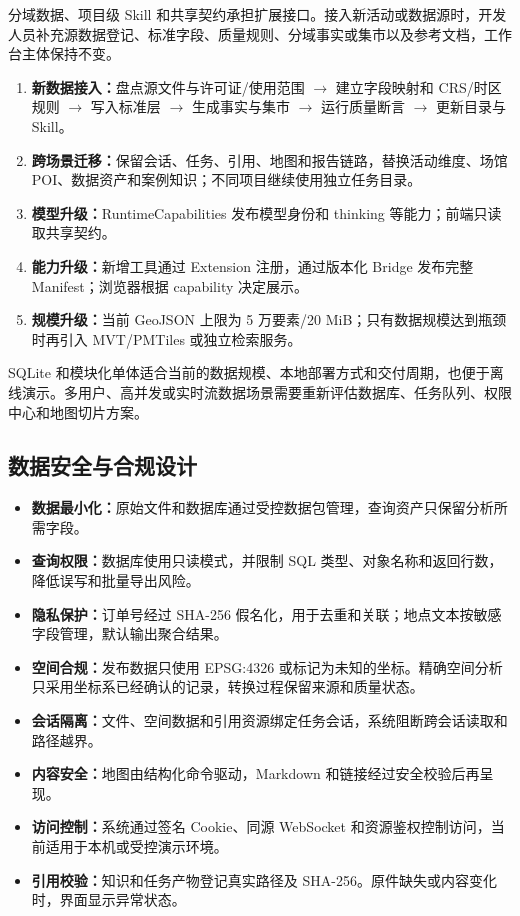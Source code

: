 \documentclass[a4paper,11pt]{article}
\newcommand{\term}[1]{\textbf{#1}}
\begin{document}
分域数据、项目级 Skill 和共享契约承担扩展接口。接入新活动或数据源时，开发人员补充源数据登记、标准字段、质量规则、分域事实或集市以及参考文档，工作台主体保持不变。

\begin{enumerate}
  \item \term{新数据接入：}盘点源文件与许可证/使用范围 $\rightarrow$ 建立字段映射和 CRS/时区规则 $\rightarrow$ 写入标准层 $\rightarrow$ 生成事实与集市 $\rightarrow$ 运行质量断言 $\rightarrow$ 更新目录与 Skill。
  \item \term{跨场景迁移：}保留会话、任务、引用、地图和报告链路，替换活动维度、场馆 POI、数据资产和案例知识；不同项目继续使用独立任务目录。
  \item \term{模型升级：}RuntimeCapabilities 发布模型身份和 thinking 等能力；前端只读取共享契约。
  \item \term{能力升级：}新增工具通过 Extension 注册，通过版本化 Bridge 发布完整 Manifest；浏览器根据 capability 决定展示。
  \item \term{规模升级：}当前 GeoJSON 上限为 5 万要素/20 MiB；只有数据规模达到瓶颈时再引入 MVT/PMTiles 或独立检索服务。
\end{enumerate}

SQLite 和模块化单体适合当前的数据规模、本地部署方式和交付周期，也便于离线演示。多用户、高并发或实时流数据场景需要重新评估数据库、任务队列、权限中心和地图切片方案。

\subsection{数据安全与合规设计}

\begin{itemize}
  \item \term{数据最小化：}原始文件和数据库通过受控数据包管理，查询资产只保留分析所需字段。
  \item \term{查询权限：}数据库使用只读模式，并限制 SQL 类型、对象名称和返回行数，降低误写和批量导出风险。
  \item \term{隐私保护：}订单号经过 SHA-256 假名化，用于去重和关联；地点文本按敏感字段管理，默认输出聚合结果。
  \item \term{空间合规：}发布数据只使用 EPSG:4326 或标记为未知的坐标。精确空间分析只采用坐标系已经确认的记录，转换过程保留来源和质量状态。
  \item \term{会话隔离：}文件、空间数据和引用资源绑定任务会话，系统阻断跨会话读取和路径越界。
  \item \term{内容安全：}地图由结构化命令驱动，Markdown 和链接经过安全校验后再呈现。
  \item \term{访问控制：}系统通过签名 Cookie、同源 WebSocket 和资源鉴权控制访问，当前适用于本机或受控演示环境。
  \item \term{引用校验：}知识和任务产物登记真实路径及 SHA-256。原件缺失或内容变化时，界面显示异常状态。
\end{itemize}
\end{document}
